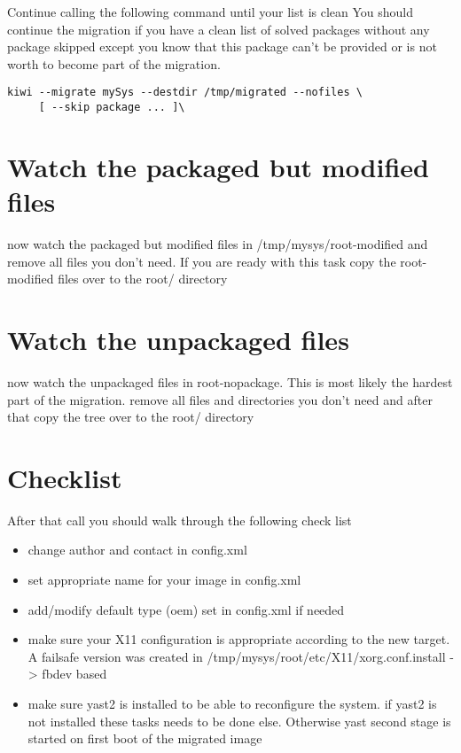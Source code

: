 Continue calling the following command until your list is clean
You should continue the migration if you have a clean list of solved
packages without any package skipped except you know that this package
can't be provided or is not worth to become part of the migration.

\begin{Command}{12cm}
\begin{verbatim}
kiwi --migrate mySys --destdir /tmp/migrated --nofiles \
     [ --skip package ... ]\
\end{verbatim}
\end{Command}

\section{Watch the packaged but modified files}
now watch the packaged but modified files in /tmp/mysys/root-modified
and remove all files you don't need. If you are ready with this task
copy the root-modified files over to the root/ directory

\section{Watch the unpackaged files}
now watch the unpackaged files in root-nopackage. This is most likely
the hardest part of the migration. remove all files and directories
you don't need and after that copy the tree over to the root/ directory

\section{Checklist}
After that call you should walk through the following check list

\begin{itemize}
\item change author and contact in config.xml
\item set appropriate name for your image in config.xml
\item add/modify default type (oem) set in config.xml if needed
\item make sure your X11 configuration is appropriate according to
      the new target. A failsafe version was created in
      /tmp/mysys/root/etc/X11/xorg.conf.install -> fbdev based
\item make sure yast2 is installed to be able to reconfigure
      the system. if yast2 is not installed these tasks needs to
      be done else. Otherwise yast second stage is started on first
      boot of the migrated image
\end{itemize}

